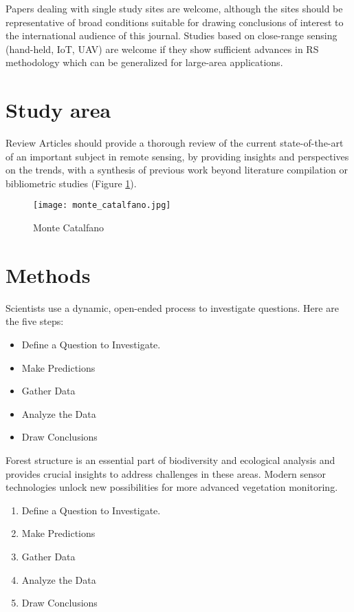 \documentclass[a4paper, 12pt]{article}
\begin{document}
\bigskip
Papers dealing with single study sites are welcome, although the sites should be representative of broad conditions suitable for drawing conclusions of interest to the international audience of this journal. Studies based on close-range sensing (hand-held, IoT, UAV) are welcome if they show sufficient advances in RS methodology which can be generalized for large-area applications.

\newpage
\section{Study area}
Review Articles should provide a thorough review of the current state-of-the-art of an important subject in remote sensing, by providing insights and perspectives on the trends, with a synthesis of previous work beyond literature compilation or bibliometric studies (Figure \ref{fig: monte}).
\begin{figure}[H]
\centering
\texttt{[image: monte\_catalfano.jpg]}
\caption{Monte Catalfano}
\label{fig: monte}
\end{figure}


\section{Methods}
Scientists use a dynamic, open-ended process to investigate questions. Here are the five steps:
\begin{itemize}
    \item Define a Question to Investigate.
    \item Make Predictions
    \item Gather Data
    \item Analyze the Data
    \item Draw Conclusions
\end{itemize}
Forest structure is an essential part of biodiversity and ecological analysis and provides crucial insights to address
challenges in these areas. Modern sensor technologies unlock new possibilities for more advanced vegetation
monitoring.
\begin{enumerate}
    \item Define a Question to Investigate.
    \item Make Predictions
    \item Gather Data
    \item Analyze the Data
    \item Draw Conclusions
\end{enumerate}
\end{document}

